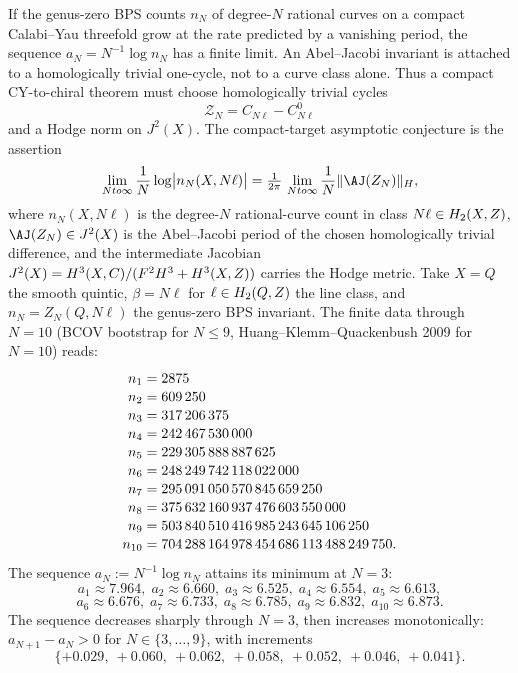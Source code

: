 \documentclass[12pt]{amsart}
\theoremstyle{remark}
\begin{document}
If the genus-zero BPS counts \(n_N\) of degree-\(N\) rational curves on
a compact Calabi--Yau threefold grow at the rate predicted by a
vanishing period, the sequence \(a_N=N^{-1}\log n_N\) has a finite
limit.  An Abel--Jacobi invariant is attached to a homologically
trivial one-cycle, not to a curve class alone.  Thus a compact
CY-to-chiral theorem must choose homologically trivial cycles
\[
  \mathcal Z_N=C_{N\ell}-C^0_{N\ell}
\]
and a Hodge norm on \(J^2(X)\).  The compact-target asymptotic
conjecture is the assertion
\[
  \lim_{N\to\infty}\frac1N\log\bigl|n_N(X,N\ell)\bigr|
  =
  \tfrac1{2\pi}\,
  \lim_{N\to\infty}\frac1N\|\AJ(\mathcal Z_N)\|_H,
\]
where \(n_N(X,N\ell)\) is the degree-\(N\) rational-curve count in
class \(N\ell\in H_2(X,Z)\), \(\AJ(\mathcal Z_N)\in J^2(X)\) is
the Abel--Jacobi period of the chosen homologically trivial difference, and the
intermediate Jacobian
\(J^2(X)=H^3(X,C)/(F^2H^3+H^3(X,Z))\) carries the Hodge metric.  Take
\(X=Q\) the smooth quintic, \(\beta=N\ell\) for \(\ell\in H_2(Q,Z)\)
the line class, and \(n_N=Z_N(Q,N\ell)\) the genus-zero BPS invariant.  The
finite data through \(N=10\) (BCOV bootstrap for \(N\le 9\),
Huang--Klemm--Quackenbush 2009 for \(N=10\)) reads:
$$\renewcommand{\arraystretch}{1.1}
\begin{array}{r@{\;=\;}l}
  n_1 & 2875 \\
  n_2 & 609\,250 \\
  n_3 & 317\,206\,375 \\
  n_4 & 242\,467\,530\,000 \\
  n_5 & 229\,305\,888\,887\,625 \\
  n_6 & 248\,249\,742\,118\,022\,000 \\
  n_7 & 295\,091\,050\,570\,845\,659\,250 \\
  n_8 & 375\,632\,160\,937\,476\,603\,550\,000 \\
  n_9 & 503\,840\,510\,416\,985\,243\,645\,106\,250 \\
  n_{10} & 704\,288\,164\,978\,454\,686\,113\,488\,249\,750.
\end{array}$$
The sequence $a_N := N^{-1} \log n_N$ attains its minimum at $N=3$:
$$
a_1 \approx 7.964,\;
a_2 \approx 6.660,\;
a_3 \approx 6.525,\;
a_4 \approx 6.554,\;
a_5 \approx 6.613,
$$
$$
a_6 \approx 6.676,\;
a_7 \approx 6.733,\;
a_8 \approx 6.785,\;
a_9 \approx 6.832,\;
a_{10} \approx 6.873.
$$
The sequence decreases sharply through $N = 3$, then increases
monotonically: $a_{N+1} - a_N > 0$ for $N \in \{3, \dots, 9\}$, with
increments
\[
\{+0.029,\ +0.060,\ +0.062,\ +0.058,\ +0.052,\ +0.046,\ +0.041\}.
\]
\end{document}
